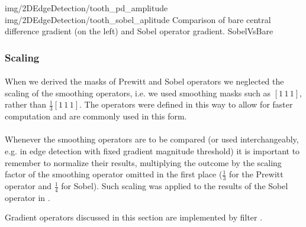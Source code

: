 \twoFigures
{img/2DEdgeDetection/tooth_pd_amplitude}
{img/2DEdgeDetection/tooth_sobel_aplitude}
{Comparison of bare central difference gradient (on the left) and Sobel operator gradient.}
{SobelVsBare}
{\basicWidth}


\subsubsection{Scaling}

\paragraph*{}
When we derived the masks of Prewitt and Sobel operators we neglected the scaling of the smoothing operators, i.e. we used smoothing masks such as $[1 \, 1 \, 1]$, rather than $\frac{1}{3} [1 \, 1 \, 1]$. The operators were defined in this way to allow for faster computation and are commonly used in this form.

\paragraph*{}
Whenever the smoothing operators are to be compared (or used interchangeably, e.g. in edge detection with fixed gradient magnitude threshold) it is important to remember to normalize their results, multiplying the outcome by the scaling factor of the smoothing operator omitted in the first place ($\frac{1}{3}$ for the Prewitt operator and $\frac{1}{4}$ for Sobel). Such scaling was applied to the results of the Sobel operator in .

\begin{refImpl}
Gradient operators discussed in this section are implemented by \studio filter .
\end{refImpl}